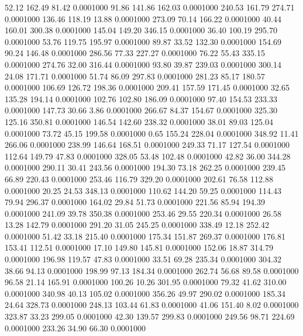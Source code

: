   52.12  162.49   81.42   0.0001000
  91.86  141.86  162.03   0.0001000
 240.53  161.79  274.71   0.0001000
 136.46  118.19   13.88   0.0001000
 273.09   70.14  166.22   0.0001000
  40.44  160.01  300.38   0.0001000
 145.04  149.20  346.15   0.0001000
  36.40  100.19  295.70   0.0001000
  53.76  119.75  195.97   0.0001000
  89.87   33.52  132.30   0.0001000
 154.69   90.24  146.48   0.0001000
 286.56   77.33  227.27   0.0001000
  76.22   55.43  335.15   0.0001000
 274.76   32.00  316.44   0.0001000
  93.80   39.87  239.03   0.0001000
 300.14   24.08  171.71   0.0001000
  51.74   86.09  297.83   0.0001000
 281.23   85.17  180.57   0.0001000
 106.69  126.72  198.36   0.0001000
 209.41  157.59  171.45   0.0001000
  32.65  135.28  194.14   0.0001000
 102.76  102.80  186.09   0.0001000
  97.40  154.53  233.33   0.0001000
 147.73   30.66    3.86   0.0001000
 266.67   84.37  154.67   0.0001000
 325.30  125.16  350.81   0.0001000
 146.54  142.60  238.32   0.0001000
  38.01   89.03  125.04   0.0001000
  73.72   45.15  199.58   0.0001000
   0.65  155.24  228.04   0.0001000
 348.92   11.41  266.06   0.0001000
 238.99  146.64  168.51   0.0001000
 249.33   71.17  127.54   0.0001000
 112.64  149.79   47.83   0.0001000
 328.05   53.48  102.48   0.0001000
  42.82   36.00  344.28   0.0001000
 290.11   30.41  243.56   0.0001000
 194.30   73.18  262.25   0.0001000
 239.45   66.89  220.43   0.0001000
 253.46  116.79  329.20   0.0001000
 202.61   76.58  112.88   0.0001000
  20.25   24.53  348.13   0.0001000
 110.62  144.20   59.25   0.0001000
 114.43   79.94  296.37   0.0001000
 164.02   29.84   51.73   0.0001000
 221.56   85.94  194.39   0.0001000
 241.09   39.78  350.38   0.0001000
 253.46   29.55  220.34   0.0001000
  26.58   13.28  142.79   0.0001000
 291.20   31.05  245.25   0.0001000
 338.49   12.18  252.42   0.0001000
  51.42   33.18  215.40   0.0001000
 175.34  151.87  269.37   0.0001000
 176.81  153.41  112.51   0.0001000
  17.10  149.80  145.81   0.0001000
 152.06   18.87  314.79   0.0001000
 196.98  119.57   47.83   0.0001000
  33.51   69.28  235.34   0.0001000
 304.32   38.66   94.13   0.0001000
 198.99   97.13  184.34   0.0001000
 262.74   56.68   89.58   0.0001000
  96.58   21.14  165.91   0.0001000
 100.26   10.26  301.95   0.0001000
  79.32   41.62  310.00   0.0001000
 340.98   40.13  105.02   0.0001000
 356.26   49.97  290.02   0.0001000
 185.34   24.64  328.73   0.0001000
 248.13  103.44   61.83   0.0001000
  41.06  151.40    8.02   0.0001000
 323.87   33.23  299.05   0.0001000
  42.30  139.57  299.83   0.0001000
 249.56   98.71  224.69   0.0001000
 233.26   34.90   66.30   0.0001000
